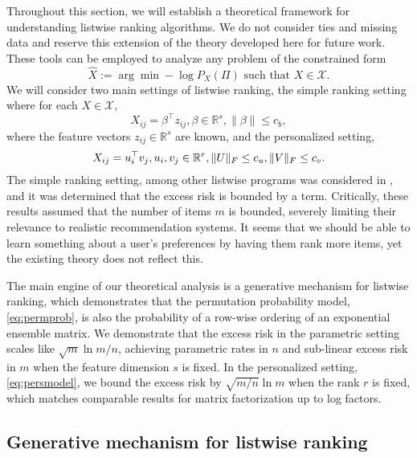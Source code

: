 \documentclass{article}
\begin{document}
Throughout this section, we will establish a theoretical framework for understanding listwise ranking algorithms.
We do not consider ties and missing data and reserve this extension of the theory developed here for future work.
These tools can be employed to analyze any problem of the constrained form 
\begin{equation}
\label{eq:constrainedform}
\hat X := \arg\min - \log P_X(\Pi) \textrm{ such that } X \in \mathcal X.
\end{equation}
We will consider two main settings of listwise ranking, the simple ranking setting where for each $X \in \mathcal X$, 
\begin{equation}
\label{eq:simplepara}
X_{ij} = \beta^\top z_{ij}, \beta \in \mathbb R^{s}, \| \beta \| \le c_b,
\end{equation}
where the feature vectors $z_{ij} \in \mathbb R^{s}$ are known, and the personalized setting, 
\begin{equation}
\label{eq:persmodel}
    X_{ij} = u_i^\top v_j, \\ u_i, v_j \in \mathbb R^{r}, \| U \|_F \le c_u, \| V \|_F \le c_v.
\end{equation}
The simple ranking setting, among other listwise programs was considered in \cite{lan2009generalization}, and it was determined that the excess risk is bounded by a  term.
Critically, these results assumed that the number of items $m$ is bounded, severely limiting their relevance to realistic recommendation systems.
It seems that we should be able to learn something about a user's preferences by having them rank more items, yet the existing theory does not reflect this.

The main engine of our theoretical analysis is a generative mechanism for listwise ranking, which demonstrates that the permutation probability model, \eqref{eq:permprob}, is also the probability of a row-wise ordering of an exponential ensemble matrix.
We demonstrate that the excess risk in the parametric setting scales like $\sqrt{m} \ln m / n$, achieving parametric rates in $n$ and sub-linear excess risk in $m$ when the feature dimension $s$ is fixed.
In the personalized setting, \eqref{eq:persmodel}, we bound the excess risk by $\sqrt{m/n} \ln m$ when the rank $r$ is fixed, which matches comparable results for matrix factorization up to log factors.

\subsection{Generative mechanism for listwise ranking}
\end{document}
